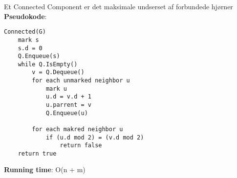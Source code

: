 Et Connected Component er det maksimale undserset af forbundede hjørner\\
\textbf{Pseudokode}:
\begin{lstlisting}[frame=single, mathescape=true]
Connected(G)
	mark s
	s.d = 0
	Q.Enqueue(s)
	while Q.IsEmpty()
		v = Q.Dequeue()
		for each unmarked neighbor u
			mark u
			u.d = v.d + 1
			u.parrent = v
			Q.Enqueue(u)
		
		for each makred neighbor u
			if (u.d mod 2) = (v.d mod 2)
				return false
	return true
\end{lstlisting}
\textbf{Running time}: O(n + m)
